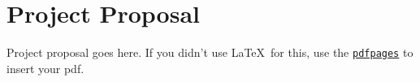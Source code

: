 \chapter{Project Proposal}

Project proposal goes here. If you didn't use \LaTeX \ for this, use the \href{https://texdoc.org/serve/pdfpages.pdf/0}{\texttt{pdfpages}} to insert your pdf.